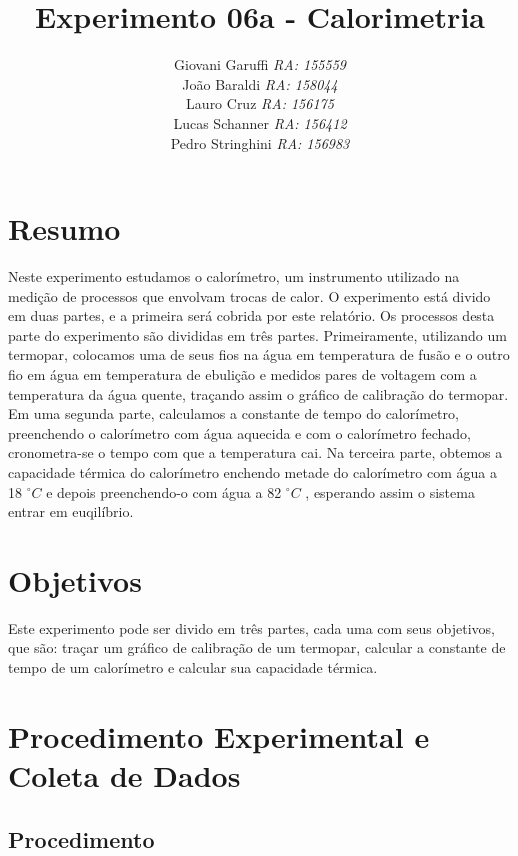 \documentclass[12pt,a4paper]{article}
\begin{document}
\title{\vspace{70mm}\Huge Experimento 06a - Calorimetria}
\author{ Giovani Garuffi\qquad\hfill
		\textit {RA: 155559}\protect\\
		João Baraldi\hfill
		\textit{RA: 158044}\protect\\
		Lauro Cruz\hfill
		\textit{RA: 156175}\protect\\
		Lucas Schanner\hfill
		\textit{RA: 156412}\protect\\
		Pedro Stringhini\hfill
		\textit {RA: 156983}								
		}
\maketitle
\newpage
\section{Resumo}
Neste experimento estudamos o calorímetro, um instrumento utilizado na medição de processos que envolvam trocas de calor.
O experimento está divido em duas partes, e a primeira será cobrida por este relatório. Os processos desta parte do experimento são divididas em três partes. Primeiramente, utilizando um termopar, colocamos uma de seus fios na água em temperatura de fusão e o outro fio em água em temperatura de ebulição e medidos pares de voltagem com a temperatura da água quente, traçando assim o gráfico de calibração do termopar.
Em uma segunda parte, calculamos a constante de tempo do calorímetro, preenchendo o calorímetro com água aquecida e com o calorímetro fechado, cronometra-se o tempo com que a temperatura cai.
Na terceira parte, obtemos a capacidade térmica do calorímetro enchendo metade do calorímetro com água a 18 $^{\circ}C$ e depois preenchendo-o com água a 82 $^{\circ}C$ , esperando assim o sistema entrar em euqilíbrio.

\section{Objetivos}
Este experimento pode ser divido em três partes, cada uma com seus objetivos, que são: traçar um gráfico de calibração de um termopar, calcular a constante de tempo de um calorímetro e calcular sua capacidade térmica.


\section{Procedimento Experimental e Coleta de Dados}


\subsection{Procedimento}
\end{document}
